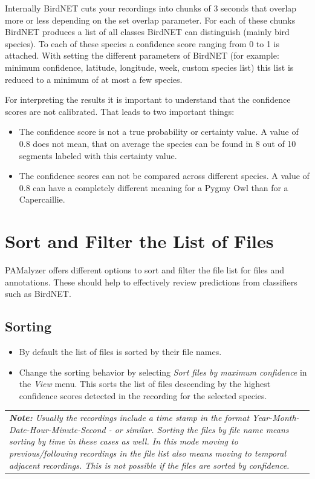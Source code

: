 \documentclass{scrartcl}
\begin{document}
Internally BirdNET cuts your recordings into chunks of 3 seconds that overlap more or less depending on the set overlap parameter.
For each of these chunks BirdNET produces a list of all classes BirdNET can distinguish (mainly bird species).
To each of these species a confidence score ranging from 0 to 1 is attached.
With setting the different parameters of BirdNET (for example: minimum confidence, latitude, longitude, week, custom species list) this list is reduced to a minimum of at most a few species. 

For interpreting the results it is important to understand that the confidence scores are not calibrated. That leads to two important things:

\begin{itemize}
	\item The confidence score is not a true probability or certainty value.
		A value of 0.8 does not mean, that on average the species can be found in 8 out of 10 segments labeled with this certainty value.
	\item The confidence scores can not be compared across different species.
		A value of 0.8 can have a completely different meaning for a Pygmy Owl than for a Capercaillie.
\end{itemize}

\section{Sort and Filter the List of Files}\label{sec:review}
PAMalyzer offers different options to sort and filter the file list for files and annotations.
These should help to effectively review predictions from classifiers such as BirdNET. 
\subsection{Sorting}

\begin{itemize}
	\item By default the list of files is sorted by their file names. 
\item Change the sorting behavior by selecting \textit{Sort files by maximum confidence} in the \textit{View} menu.
This sorts the list of files descending by the highest confidence scores detected in the recording for the selected species. 
\end{itemize}

\begin{table}[ht!]
		\centering
		\begin{tabular}{p{}}
			\textit{\textbf{Note:} Usually the recordings include a time stamp in the format Year-Month-Date-Hour-Minute-Second - or similar. Sorting the files by file name means sorting by time in these cases as well. In this mode moving to previous/following recordings in the file list also means moving to temporal adjacent recordings. This is not possible if the files are sorted by confidence.}
		\end{tabular}
	\end{table}
\end{document}

